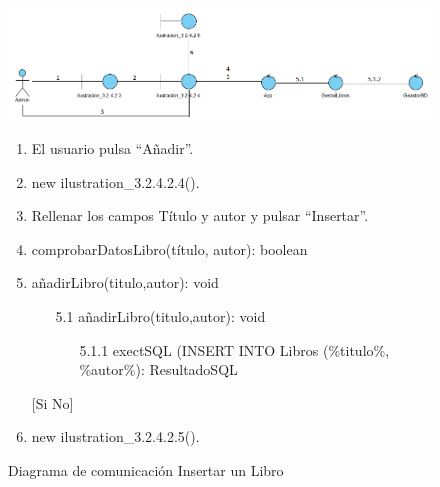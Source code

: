 ﻿\documentclass{report}
\begin{document}
                    \begin{figure}[H]
                \centering
                \includegraphics[width=1.1\textwidth]{img/comunicacion/Diagrama4.png}
                \caption{Diagrama de comunicación Insertar un Libro}
            \clearpage
            \begin{enumerate}
                \item El usuario pulsa ``Añadir''.
                \item new ilustration\_3.2.4.2.4().
                \item Rellenar los campos Título y autor y pulsar ``Insertar''.
                \item comprobarDatosLibro(título, autor): boolean 
                \newline
                [Si comprobarDatosLibro == TRUE]
                \item  añadirLibro(titulo,autor): void
                \begin{enumerate}
                    \item[5.1]  añadirLibro(titulo,autor): void
                        \begin{enumerate}
                            \item[5.1.1] exectSQL (INSERT INTO Libros (\%titulo\%, \%autor\%): ResultadoSQL
                        \end{enumerate}
                    \end{enumerate}
                    [Si No]
                \item new ilustration\_3.2.4.2.5().
            \end{enumerate}
            \end{figure}
\end{document}
